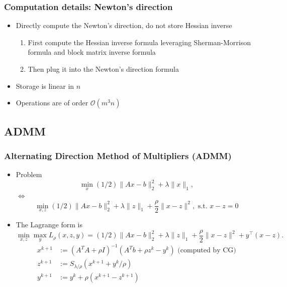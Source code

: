 \documentclass{beamer}
\begin{document}
\begin{frame}
\frametitle{Computation details: Newton's direction}
\begin{itemize}
\item Directly compute the Newton's direction, do not store Hessian inverse
\begin{enumerate}
    \item First compute the Hessian inverse formula leveraging Sherman-Morrison formula and block matrix inverse formula
    \item Then plug it into the Newton's direction formula
\end{enumerate}
\item Storage is linear in $n$
\item Operations are of order $\mathcal{O}(m^3n)$
\end{itemize}
\end{frame}


\subsection{ADMM}
\begin{frame}
\frametitle{Alternating Direction Method of Multipliers (ADMM)}
\begin{itemize}
\item Problem
\begin{equation}
    \min_{x}(1 / 2)\|A x-b\|_{2}^{2}+\lambda\|x\|_{1},
\end{equation}
$\iff$
\begin{equation}
    \min_{x, z}(1 / 2)\|A x-b\|_{2}^{2}+\lambda\|z\|_{1} + \frac{\rho}{2}\|x-z\|^2,\text{ s.t. }x - z = 0
\end{equation}
\item The Lagrange form is 
\begin{equation}
    \min_{x,z}\max_{y} L_{\rho}(x,z,y) = (1 / 2)\|A x-b\|_{2}^{2}+\lambda\|z\|_{1} + \frac{\rho}{2}\|x-z\|^2 + y^{\top}(x-z).
\end{equation}
\begin{equation}
    \begin{aligned}
x^{k+1} &:=\left(A^{T} A+\rho I\right)^{-1}\left(A^{T} b+\rho z^{k}-y^{k}\right) \text{ (computed by CG)}\\
z^{k+1} &:=S_{\lambda / \rho}\left(x^{k+1}+y^{k} / \rho\right) \\
y^{k+1} &:=y^{k}+\rho\left(x^{k+1}-z^{k+1}\right)
\end{aligned}
\end{equation}
\end{itemize}
\end{frame}
\end{document}

